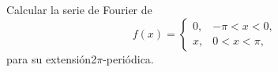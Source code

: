 Calcular la serie de Fourier de
\[f(x)=\begin{cases}0,&-\pi<x<0,\\x,&0<x<\pi,\end{cases}\]
para su extensión2\ensuremath{\pi}-periódica.
